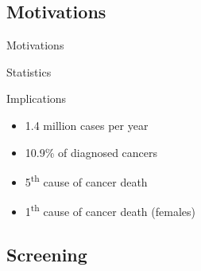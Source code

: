 \graphicspath{{chapters/introduction/figures/}}


\subsection{Motivations}

\begin{frame}{Motivations}
  \begin{block}{\small Statistics}
    \begin{figure}%
      \centering
      \hspace*{\fill}%
      \hfill%
        \hspace*{\fill}%
      \label{fig:stat1}%
    \end{figure}
  \end{block}
  \begin{block}{\small Implications}\footnotesize
    \begin{itemize}
      \item 1.4 million cases per year
      \item 10.9\% of diagnosed cancers
      \item 5\textsuperscript{th} cause of cancer death
      \item 1\textsuperscript{th} cause of cancer death (females)
    \end{itemize}
  \end{block}
\end{frame}

\subsection{Screening}

